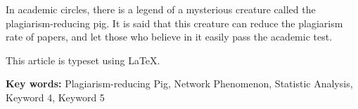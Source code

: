 {\begin{abstract}
本文旨在探讨“降重猪”传说的起源、流传和影响，以及它对学术道德和创新的潜在危害。本文采用了文献综述、网络分析和问卷调查等方法，从历史、社会、心理和教育等角度进行了多维度的分析。本文首先回顾了“降重猪”传说的出现背景和发展过程，然后通过对网络平台上关于“降重猪”的内容和评论的抓取和分析，揭示了这种传说在不同群体和领域中的流行程度和态度差异，以及它所反映出的网络文化特征和价值观倾向。接着，本文通过设计和发放在线问卷，收集了不同年龄、性别、学历、专业和职业等背景的人对于“降重猪”传说的认知、态度和行为的数据，并进行了统计分析和比较，探讨了这种传说对于人们的学习动机、写作习惯、创新能力和道德观念等方面的影响。

本文的实证分析结果表明，“降重猪”传说是一种具有较强社会影响力和文化意义的网络现象，它既反映了一些人在面对学术压力时的无奈和求助，也暴露了一些人在写作过程中缺乏规范意识和创新精神。本文发现，“降重猪”传说在不同群体中有不同的流行程度和接受度，其中以年轻人、学生、非专业人士等为主要受众。本文还发现，“降重猪”传说对于人们的学习动机、写作习惯、创新能力和道德观念等方面有不同程度的负面影响，尤其是对于那些缺乏自信、自律和自主性的人。本文认为，“降重猪”传说不仅是一个有趣的怪谈，更是一个值得关注和警惕的社会问题，它需要我们从多个层面进行干预和改善，提高人们的学术素养和创新意识。

本文使用\LaTeX 进行排版。\\ %

\par\noindent{}\textbf{\boldheiti 关键词：}
 降重猪\quad 网络现象\quad 统计分析\quad 关键词4\quad 关键词5

\end{abstract}      

\newpage
\mbox{}


\begin{enabstract}
	
In academic circles, there is a legend of a mysterious creature called the plagiarism-reducing pig. It is said that this creature can reduce the plagiarism rate of papers, and let those who believe in it easily pass the academic test. 

This article is typeset using \LaTeX.\\
\par\noindent{}\textbf{Key words:}
 Plagiarism-reducing Pig, Network Phenomenon, Statistic Analysis, Keyword 4, Keyword 5


\end{enabstract}}
